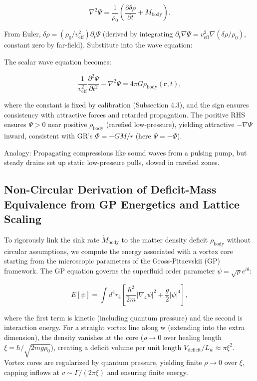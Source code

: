 \documentclass{article}
\begin{document}
\[
\nabla^2 \Psi = \frac{1}{\rho_0} \left( \frac{\partial \delta \rho}{\partial t} + \dot{M}_{\text{body}} \right).
\]

From Euler, $\delta \rho = (\rho_0 / v_{\text{eff}}^2) \partial_t \Psi$ (derived by integrating $\partial_t \nabla \Psi = v_{\text{eff}}^2 \nabla (\delta \rho / \rho_0)$, constant zero by far-field). Substitute into the wave equation:

The scalar wave equation becomes:

\[
\frac{1}{v_{\text{eff}}^2} \frac{\partial^2 \Psi}{\partial t^2} - \nabla^2 \Psi = 4\pi G \rho_{\text{body}}(\mathbf{r}, t),
\]

where the constant is fixed by calibration (Subsection 4.3), and the sign ensures consistency with attractive forces and retarded propagation. The positive RHS ensures $\Psi > 0$ near positive $\rho_{\text{body}}$ (rarefied low-pressure), yielding attractive $-\nabla \Psi$ inward, consistent with GR's $\Phi = -GM/r$ (here $\Psi = -\Phi$).

Analogy: Propagating compressions like sound waves from a pulsing pump, but steady drains set up static low-pressure pulls, slowed in rarefied zones.

\subsection{Non-Circular Derivation of Deficit-Mass Equivalence from GP Energetics and Lattice Scaling}

To rigorously link the sink rate $\dot{M}_{\text{body}}$ to the matter density deficit $\rho_{\text{body}}$ without circular assumptions, we compute the energy associated with a vortex core starting from the microscopic parameters of the Gross-Pitaevskii (GP) framework. The GP equation governs the superfluid order parameter $\psi = \sqrt{\rho} e^{i \theta}$:

\[
E[\psi] = \int d^4 r_4 \left[ \frac{\hbar^2}{2 m} |\nabla_4 \psi|^2 + \frac{g}{2} |\psi|^4 \right],
\]

where the first term is kinetic (including quantum pressure) and the second is interaction energy. For a straight vortex line along w (extending into the extra dimension), the density vanishes at the core ($\rho \to 0$ over healing length $\xi = \hbar / \sqrt{2 m g \rho_0}$), creating a deficit volume per unit length $V_{\text{deficit}} / L_w \approx \pi \xi^2$. Vortex cores are regularized by quantum pressure, yielding finite $\rho \to 0$ over $\xi$, capping inflows at $v \sim \Gamma / (2\pi \xi)$ and ensuring finite energy.
\end{document}

